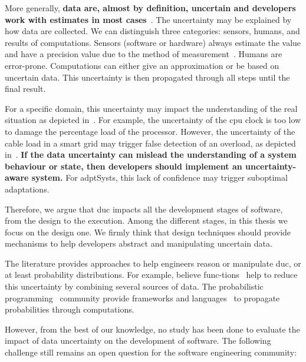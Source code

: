 More generally, \textbf{data are, almost by definition, uncertain and developers work with estimates in most cases}~\cite{DBLP:conf/asplos/BornholtMM14, metrology2008evaluation, DBLP:journals/tkde/AggarwalY09}.
The uncertainty may be explained by how data are collected.
We can distinguish three categories: sensors, humans, and results of computations.
Sensors (software or hardware) always estimate the value and have a precision value due to the method of measurement~\cite{metrology2008evaluation, DBLP:conf/asplos/BornholtMM14}.
Humans are error-prone.
Computations can either give an approximation or be based on uncertain data.
This uncertainty is then propagated through all steps until the final result.

For a specific domain, this uncertainty may impact the understanding of the real situation as depicted in~.
For example, the uncertainty of the \gls{cpu} clock is too low to damage the percentage load of the processor.
However, the uncertainty of the cable load in a smart grid may trigger false detection of an overload, as depicted in~.
\textbf{If the data uncertainty can mislead the understanding of a system behaviour or state, then developers should implement an uncertainty-aware system.}
For \glspl{adptSyst}, this lack of confidence may trigger suboptimal adaptations.

Therefore, we argue that \gls{duc} impacts all the development stages of software, from the design to the execution.
Among the different stages, in this thesis we focus on the design one.
We firmly think that design techniques should provide mechanisms to help developers abstract and manipulating uncertain data.

The literature provides approaches to help engineers reason or manipulate \gls{duc}, or at least probability distributions.
For example, believe func-\linebreak{}tions~\cite{shafer1992dempster} help to reduce this uncertainty by combining several sources of data.
The probabilistic programming~\cite{DBLP:conf/icse/GordonHNR14} community provide frameworks and languages~\cite{url:InferNET18, baudin2017openturns} to propagate probabilities through computations.

However, from the best of our knowledge, no study has been done to evaluate the impact of data uncertainty on the development of software.
The following challenge still remains an open question for the software engineering community:
\vspace{-2em}

